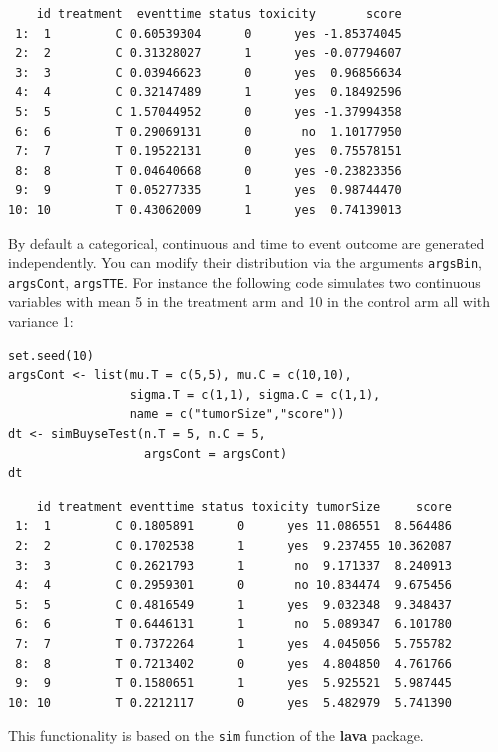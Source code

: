 \documentclass[12pt]{article}
\begin{document}
\begin{verbatim}
    id treatment  eventtime status toxicity       score
 1:  1         C 0.60539304      0      yes -1.85374045
 2:  2         C 0.31328027      1      yes -0.07794607
 3:  3         C 0.03946623      0      yes  0.96856634
 4:  4         C 0.32147489      1      yes  0.18492596
 5:  5         C 1.57044952      0      yes -1.37994358
 6:  6         T 0.29069131      0       no  1.10177950
 7:  7         T 0.19522131      0      yes  0.75578151
 8:  8         T 0.04640668      0      yes -0.23823356
 9:  9         T 0.05277335      1      yes  0.98744470
10: 10         T 0.43062009      1      yes  0.74139013
\end{verbatim}

By default a categorical, continuous and time to event outcome are
generated independently. You can modify their distribution via the
arguments \texttt{argsBin}, \texttt{argsCont}, \texttt{argsTTE}. For instance the following
code simulates two continuous variables with mean 5 in the treatment
arm and 10 in the control arm all with variance 1:
\lstset{language=r,label= ,caption= ,captionpos=b,numbers=none}
\begin{lstlisting}
set.seed(10)
argsCont <- list(mu.T = c(5,5), mu.C = c(10,10), 
                 sigma.T = c(1,1), sigma.C = c(1,1),
                 name = c("tumorSize","score"))
dt <- simBuyseTest(n.T = 5, n.C = 5,
                   argsCont = argsCont)
dt
\end{lstlisting}

\begin{verbatim}
    id treatment eventtime status toxicity tumorSize     score
 1:  1         C 0.1805891      0      yes 11.086551  8.564486
 2:  2         C 0.1702538      1      yes  9.237455 10.362087
 3:  3         C 0.2621793      1       no  9.171337  8.240913
 4:  4         C 0.2959301      0       no 10.834474  9.675456
 5:  5         C 0.4816549      1      yes  9.032348  9.348437
 6:  6         T 0.6446131      1       no  5.089347  6.101780
 7:  7         T 0.7372264      1      yes  4.045056  5.755782
 8:  8         T 0.7213402      0      yes  4.804850  4.761766
 9:  9         T 0.1580651      1      yes  5.925521  5.987445
10: 10         T 0.2212117      0      yes  5.482979  5.741390
\end{verbatim}

This functionality is based on the \texttt{sim} function of the \textbf{lava}
package.

\clearpage
\end{document}
